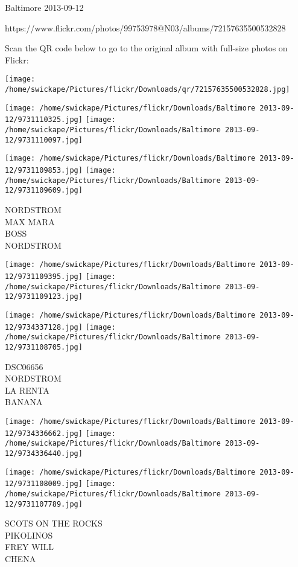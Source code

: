 \documentclass[10pt,letterpaper]{article}
\begin{document}
Baltimore 2013-09-12

https://www.flickr.com/photos/99753978@N03/albums/72157635500532828

Scan the QR code below to go to the original album with full-size photos on Flickr:

\texttt{[image: /home/swickape/Pictures/flickr/Downloads/qr/72157635500532828.jpg]}
\pagebreak

\texttt{[image: /home/swickape/Pictures/flickr/Downloads/Baltimore 2013-09-12/9731110325.jpg]}
\texttt{[image: /home/swickape/Pictures/flickr/Downloads/Baltimore 2013-09-12/9731110097.jpg]}

\texttt{[image: /home/swickape/Pictures/flickr/Downloads/Baltimore 2013-09-12/9731109853.jpg]}
\texttt{[image: /home/swickape/Pictures/flickr/Downloads/Baltimore 2013-09-12/9731109609.jpg]}

NORDSTROM\\
MAX MARA\\
BOSS\\
NORDSTROM
\pagebreak

\texttt{[image: /home/swickape/Pictures/flickr/Downloads/Baltimore 2013-09-12/9731109395.jpg]}
\texttt{[image: /home/swickape/Pictures/flickr/Downloads/Baltimore 2013-09-12/9731109123.jpg]}

\texttt{[image: /home/swickape/Pictures/flickr/Downloads/Baltimore 2013-09-12/9734337128.jpg]}
\texttt{[image: /home/swickape/Pictures/flickr/Downloads/Baltimore 2013-09-12/9731108705.jpg]}

DSC06656\\
NORDSTROM\\
LA RENTA\\
BANANA
\pagebreak

\texttt{[image: /home/swickape/Pictures/flickr/Downloads/Baltimore 2013-09-12/9734336662.jpg]}
\texttt{[image: /home/swickape/Pictures/flickr/Downloads/Baltimore 2013-09-12/9734336440.jpg]}

\texttt{[image: /home/swickape/Pictures/flickr/Downloads/Baltimore 2013-09-12/9731108009.jpg]}
\texttt{[image: /home/swickape/Pictures/flickr/Downloads/Baltimore 2013-09-12/9731107789.jpg]}

SCOTS ON THE ROCKS\\
PIKOLINOS\\
FREY WILL\\
CHENA
\pagebreak
\end{document}
